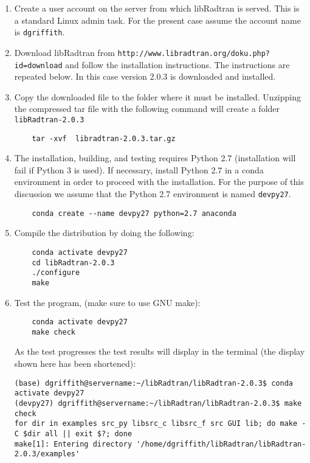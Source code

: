 \begin{enumerate}
\item Create a user account on the server from which libRadtran is served. This is a standard Linux admin task.  For the present case assume the account name is \lstinline{dgriffith}.

\item Download libRadtran from \lstinline{http://www.libradtran.org/doku.php?id=download} and follow the installation instructions. The instructions are repeated below.      In this case \libradtran{} version 2.0.3 is downloaded and installed.

\item Copy the downloaded file to the folder where it must be installed. Unzipping the compressed tar file with the following command will create a folder \lstinline{libRadtran-2.0.3}

\begin{lstlisting}
    tar -xvf  libradtran-2.0.3.tar.gz
\end{lstlisting}
\item The \libradtran{} installation, building, and testing requires Python 2.7 (installation will fail if Python 3 is used).  If necessary, install Python 2.7 in a conda environment in order to proceed with the \libradtran{} installation.  For the purpose of this discussion we assume that the Python 2.7 environment is named \lstinline{devpy27}.

\begin{lstlisting}
    conda create --name devpy27 python=2.7 anaconda
\end{lstlisting}

\item Compile the distribution by doing the following:

\begin{lstlisting}
    conda activate devpy27
    cd libRadtran-2.0.3
    ./configure
    make
\end{lstlisting}
\item Test the program, (make sure to use GNU make):

\begin{lstlisting}
    conda activate devpy27
    make check 
\end{lstlisting}
 As the test progresses the test results will display in the terminal (the display shown here has been shortened):


\begin{lstlisting}[style=tinysize]
(base) dgriffith@servername:~/libRadtran/libRadtran-2.0.3$ conda activate devpy27
(devpy27) dgriffith@servername:~/libRadtran/libRadtran-2.0.3$ make check
for dir in examples src_py libsrc_c libsrc_f src GUI lib; do make -C $dir all || exit $?; done
make[1]: Entering directory '/home/dgriffith/libRadtran/libRadtran-2.0.3/examples'


\end{lstlisting}
\end{enumerate}
